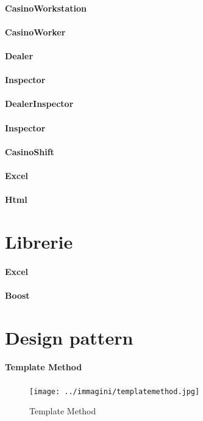 \paragraph{CasinoWorkstation}
\paragraph{CasinoWorker}
\paragraph{Dealer}
\paragraph{Inspector}
\paragraph{DealerInspector}
\paragraph{Inspector}
\paragraph{CasinoShift}
\paragraph{Excel}
\paragraph{Html}
\section{Librerie}
\paragraph{Excel}
\paragraph{Boost}
\section{Design pattern}
\paragraph{Template Method}
\begin{figure}[!h]
    \centering
        \texttt{[image: ../immagini/templatemethod.jpg]}
        \caption{Template Method}
\end{figure}
